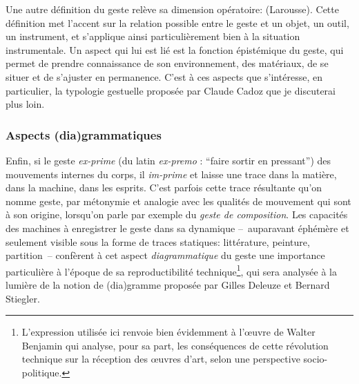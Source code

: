 \noindent Une autre définition du geste relève sa dimension opératoire:  (Larousse). Cette définition met l'accent sur la relation possible entre le geste et un objet, un outil, un instrument, et s'applique ainsi particulièrement bien à la situation instrumentale. Un aspect qui lui est lié est la fonction épistémique du geste, qui permet de prendre connaissance de son environnement, des matériaux, de se situer et de s'ajuster en permanence. C'est à ces aspects que s'intéresse, en particulier, la typologie gestuelle proposée par Claude Cadoz que je discuterai plus loin. 

\subsubsection{Aspects (dia)grammatiques}

\noindent Enfin, si le geste \textit{ex-prime} (du latin \textit{ex-premo} : ``faire sortir en pressant'') des mouvements internes du corps, il \textit{im-prime} et laisse une trace dans la matière, dans la machine, dans les esprits. C'est parfois cette trace résultante qu'on nomme geste, par métonymie et analogie avec les qualités de mouvement qui sont à son origine, lorsqu'on parle par exemple du \textit{geste de composition}. Les capacités des machines à enregistrer le geste dans sa dynamique --~auparavant éphémère et seulement visible sous la forme de traces statiques: littérature, peinture, partition~-- confèrent à cet aspect \textit{diagrammatique} du geste une importance particulière à l'époque de sa reproductibilité technique\footnote{L'expression utilisée ici renvoie bien évidemment à l'œuvre de Walter Benjamin \cite{benjamin_loeuvre_2013} qui analyse, pour sa part, les conséquences de cette révolution technique sur la réception des œuvres d'art, selon une perspective socio-politique.}, qui sera analysée à la lumière de la notion de (dia)gramme proposée par Gilles Deleuze et Bernard Stiegler.




